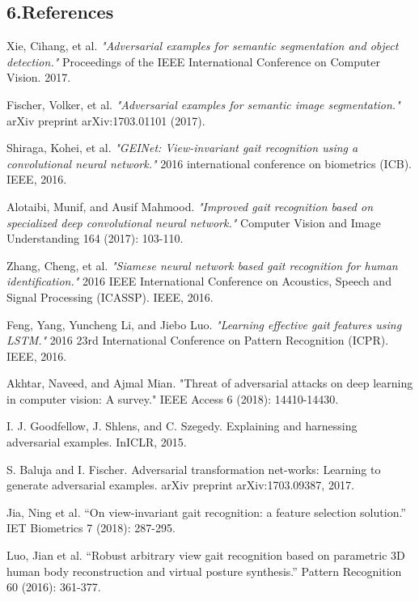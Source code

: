\documentclass[letterpaper]{article} %
\begin{document}
\subsection{6.References}
\smallskip \noindent
[1] Xie, Cihang, et al. \textit{"Adversarial examples for semantic segmentation and object detection."} Proceedings of the IEEE International Conference on Computer Vision. 2017.

\smallskip \noindent
[2] Fischer, Volker, et al. \textit{"Adversarial examples for semantic image segmentation."} arXiv preprint arXiv:1703.01101 (2017).

\smallskip \noindent
[3] Shiraga, Kohei, et al. \textit{"GEINet: View-invariant gait recognition using a convolutional neural network."} 2016 international conference on biometrics (ICB). IEEE, 2016.

\smallskip \noindent
[4] Alotaibi, Munif, and Ausif Mahmood. \textit{"Improved gait recognition based on specialized deep convolutional neural network."}  Computer Vision and Image Understanding 164 (2017): 103-110.

\smallskip \noindent
[5] Zhang, Cheng, et al. \textit{"Siamese neural network based gait recognition for human identification."} 2016 IEEE International Conference on Acoustics, Speech and Signal Processing (ICASSP). IEEE, 2016.

\smallskip \noindent
[6] Feng, Yang, Yuncheng Li, and Jiebo Luo. \textit{"Learning effective gait features using LSTM."} 2016 23rd International Conference on Pattern Recognition (ICPR). IEEE, 2016.

\smallskip \noindent
[7] Akhtar, Naveed, and Ajmal Mian. "Threat of adversarial attacks on deep learning in computer vision: A survey." IEEE Access 6 (2018): 14410-14430.

\smallskip \noindent
[8] I. J. Goodfellow, J. Shlens, and C. Szegedy. Explaining and harnessing adversarial examples. InICLR, 2015.

\smallskip \noindent
[9] S. Baluja and I. Fischer. Adversarial transformation net-works: Learning to generate adversarial examples. arXiv preprint arXiv:1703.09387, 2017.

\smallskip \noindent
[10] Jia, Ning et al. “On view-invariant gait recognition: a feature selection solution.” IET Biometrics 7 (2018): 287-295.

\smallskip \noindent
[11] Luo, Jian et al. “Robust arbitrary view gait recognition based on parametric 3D human body reconstruction and virtual posture synthesis.” Pattern Recognition 60 (2016): 361-377.
\end{document}
